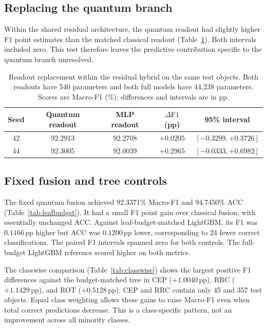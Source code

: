 \documentclass[aps,a4paper,onecolumn,11pt,unpublished]{quantumarticle}
\newcommand{\dF}{\Delta\mathrm{F1}}
\newcommand{\pp}{\,\mathrm{pp}}
\begin{document}
\subsection{Replacing the quantum branch}

Within the shared residual architecture, the quantum readout had slightly higher F1 point estimates than the matched classical readout (Table~\ref{tab:replacements}). Both intervals included zero. This test therefore leaves the predictive contribution specific to the quantum branch unresolved.

\begin{table}[htbp]
\centering
\small
\setlength{\tabcolsep}{4pt}
\caption{Readout replacement within the residual hybrid on the same test objects. Both readouts have 540 parameters and both full models have 44{,}238 parameters. Scores are Macro-F1 (\%); differences and intervals are in pp.}
\label{tab:replacements}
\begin{tabular}{@{}ccccc@{}}
\toprule
Seed & Quantum readout & MLP readout & $\dF$ (pp) & 95\% interval \\
\midrule
42 & 92.2913 & 92.2708 & $+0.0205$ & $[-0.3299,+0.3726]$ \\
44 & 92.3005 & 92.0039 & $+0.2965$ & $[-0.0333,+0.6982]$ \\
\bottomrule
\end{tabular}
\end{table}

\subsection{Fixed fusion and tree controls}

The fixed quantum fusion achieved 92.3371\% Macro-F1 and 94.7450\% ACC (Table~\ref{tab:leafbudget}). It had a small F1 point gain over classical fusion, with essentially unchanged ACC. Against leaf-budget-matched LightGBM, its F1 was $0.1166\pp$ higher but ACC was $0.1200\pp$ lower, corresponding to 24 fewer correct classifications. The paired F1 intervals spanned zero for both controls. The full-budget LightGBM reference scored higher on both metrics.

The classwise comparison (Table~\ref{tab:classwise}) shows the largest positive F1 differences against the budget-matched tree in CEP ($+1.0040\pp$), RRC ($+1.1429\pp$), and ROT ($+0.5128\pp$). CEP and RRC contain only 45 and 357 test objects. Equal class weighting allows these gains to raise Macro-F1 even when total correct predictions decrease. This is a class-specific pattern, not an improvement across all minority classes.
\end{document}
